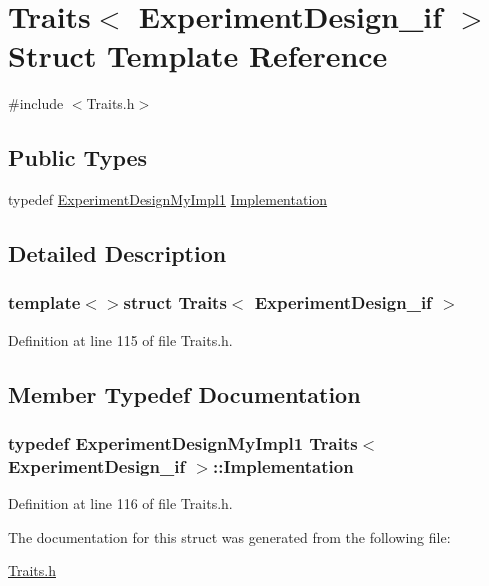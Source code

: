 \hypertarget{struct_traits_3_01_experiment_design__if_01_4}{\section{Traits$<$ Experiment\-Design\-\_\-if $>$ Struct Template Reference}
\label{struct_traits_3_01_experiment_design__if_01_4}
}


{\ttfamily \#include $<$Traits.\-h$>$}

\subsection*{Public Types}
\begin{DoxyCompactItemize}
\item 
typedef \hyperlink{class_experiment_design_my_impl1}{Experiment\-Design\-My\-Impl1} \hyperlink{struct_traits_3_01_experiment_design__if_01_4_a4db588b8322b2ff35e2df160dd3ef684}{Implementation}
\end{DoxyCompactItemize}


\subsection{Detailed Description}
\subsubsection*{template$<$$>$struct Traits$<$ Experiment\-Design\-\_\-if $>$}



Definition at line 115 of file Traits.\-h.



\subsection{Member Typedef Documentation}
\hypertarget{struct_traits_3_01_experiment_design__if_01_4_a4db588b8322b2ff35e2df160dd3ef684}{
\subsubsection[{Implementation}]{\setlength{\rightskip}{0pt plus 5cm}typedef {\bf Experiment\-Design\-My\-Impl1} {\bf Traits}$<$ {\bf Experiment\-Design\-\_\-if} $>$\-::{\bf Implementation}}}\label{struct_traits_3_01_experiment_design__if_01_4_a4db588b8322b2ff35e2df160dd3ef684}


Definition at line 116 of file Traits.\-h.



The documentation for this struct was generated from the following file\-:\begin{DoxyCompactItemize}
\item 
\hyperlink{_traits_8h}{Traits.\-h}\end{DoxyCompactItemize}
